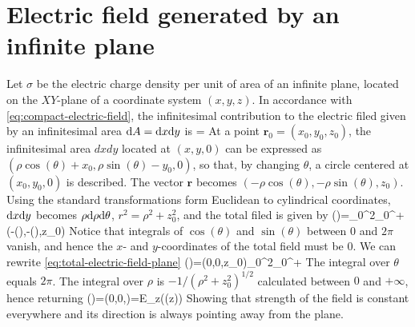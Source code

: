 \section{Electric field generated by an infinite plane}
Let $\sigma$ be the electric charge density per unit of area of an infinite plane, located on the $XY$-plane of a coordinate system $(x,y,z)$. In accordance with \ref{eq:compact-electric-field}, the infinitesimal contribution to the electric filed given by an infinitesimal area $\mathrm{d}A=\mathrm{d}x\mathrm{d}y$ is
\be
{}=
\ee
At a point $\mathbf{r}_{0}=(x_{0},y_{0},z_{0})$, the infinitesimal area $dxdy$ located at $(x,y,0)$ can be expressed as $(\rho\cos(\theta)+x_{0},\rho\sin(\theta)-y_{0},0)$, so that, by changing $\theta$, a circle centered at $(x_{0},y_{0},0)$ is described. The vector $\mathbf{r}$ becomes $(-\rho\cos(\theta),-\rho\sin(\theta),z_{0})$.
Using the standard transformations form Euclidean to cylindrical coordinates, $\mathrm{d}x\mathrm{d}y$ becomes $\rho\mathrm{d}\rho\mathrm{d}\theta$, $r^{2}=\rho^{2}+z_{0}^{2}$, and the total filed is given by 
\be\label{eq:total-electric-field-plane}
()=\int_{0}^{2\pi}\total{\theta}\int_{0}^{+\infty}\total{\rho}(-\rho\cos(\theta),-\rho\sin(\theta),z_{0})
\ee
Notice that integrals of $\cos(\theta)$ and $\sin(\theta)$ between $0$ and $2\pi$ vanish, and hence the $x$- and $y$-coordinates of the total field must be $0$. We can rewrite \ref{eq:total-electric-field-plane}
\be\label{eq:total-electric-field-plane-simplified}
()=(0,0,z_{0})\int_{0}^{2\pi}\total{\theta}\int_{0}^{+\infty}\total{\rho}
\ee
The integral over $\theta$ equals $2\pi$. The integral over $\rho$ is $-1/(\rho^{2}+z_{0}^{2})^{1/2}$ calculated between $0$ and $+\infty$, hence returning
\be\label{eq:total-electric-field-plane-final}
()=(0,0,)=E_{z}(\sign(z))
\ee
Showing that strength of the field is constant everywhere and its direction is always pointing away from the plane.